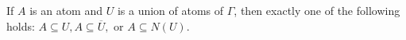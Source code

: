 If $A$ is an atom and $U$ is a union of atoms of $\Gamma$, then exactly one of the following holds: $A \subseteq U, A \subseteq \overline{U},$ or $A \subseteq N(U)$.
